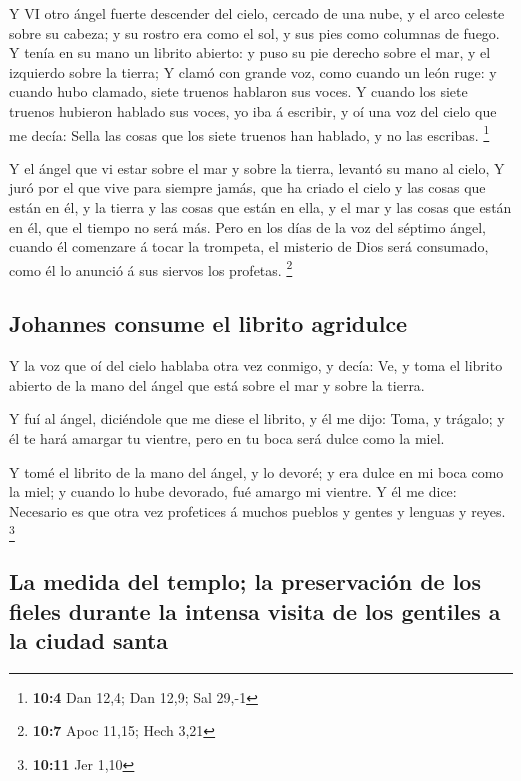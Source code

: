  Y VI otro ángel fuerte descender del cielo, cercado de una
nube, y el arco celeste sobre su cabeza; y su rostro era como el sol, y
sus pies como columnas de fuego.  Y tenía en su mano un
librito abierto: y puso su pie derecho sobre el mar, y el izquierdo
sobre la tierra;  Y clamó con grande voz, como cuando un
león ruge: y cuando hubo clamado, siete truenos hablaron sus voces.
 Y cuando los siete truenos hubieron hablado sus voces, yo
iba á escribir, y oí una voz del cielo que me decía: Sella las cosas que
los siete truenos han hablado, y no las escribas. \footnote{\textbf{10:4}
  Dan 12,4; Dan 12,9; Sal 29,-1}

 Y el ángel que vi estar sobre el mar y sobre la tierra,
levantó su mano al cielo,  Y juró por el que vive para
siempre jamás, que ha criado el cielo y las cosas que están en él, y la
tierra y las cosas que están en ella, y el mar y las cosas que están en
él, que el tiempo no será más.  Pero en los días de la voz
del séptimo ángel, cuando él comenzare á tocar la trompeta, el misterio
de Dios será consumado, como él lo anunció á sus siervos los profetas.
\footnote{\textbf{10:7} Apoc 11,15; Hech 3,21}

\hypertarget{johannes-consume-el-librito-agridulce}{%
\subsection{Johannes consume el librito
agridulce}\label{johannes-consume-el-librito-agridulce}}

 Y la voz que oí del cielo hablaba otra vez conmigo, y
decía: Ve, y toma el librito abierto de la mano del ángel que está sobre
el mar y sobre la tierra.

 Y fuí al ángel, diciéndole que me diese el librito, y él me
dijo: Toma, y trágalo; y él te hará amargar tu vientre, pero en tu boca
será dulce como la miel.

 Y tomé el librito de la mano del ángel, y lo devoré; y era
dulce en mi boca como la miel; y cuando lo hube devorado, fué amargo mi
vientre.  Y él me dice: Necesario es que otra vez
profetices á muchos pueblos y gentes y lenguas y reyes. \footnote{\textbf{10:11}
  Jer 1,10}

\hypertarget{la-medida-del-templo-la-preservaciuxf3n-de-los-fieles-durante-la-intensa-visita-de-los-gentiles-a-la-ciudad-santa}{%
\subsection{La medida del templo; la preservación de los fieles durante
la intensa visita de los gentiles a la ciudad
santa}\label{la-medida-del-templo-la-preservaciuxf3n-de-los-fieles-durante-la-intensa-visita-de-los-gentiles-a-la-ciudad-santa}}

